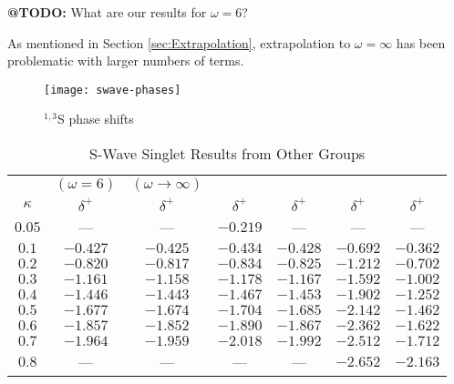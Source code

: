 \documentclass[Dissertation.tex]{subfiles}
\begin{document}
\textbf{@TODO:} What are our results for $\omega = 6$?

As mentioned in Section \ref{sec:Extrapolation}, extrapolation to $\omega = \infty$ has been problematic with larger numbers of terms.

\begin{figure}[H]
	\centering
	\texttt{[image: swave-phases]}
	\caption{$^{1,3}$S phase shifts}
	\label{fig:SWavePhase}
\end{figure}


\begin{table}[H]
\centering
\begin{tabular}{c c c c c c c}
\toprule
 & $(\omega = 6)$ & $(\omega \rightarrow \infty)$ &  &  &  & \\
$\kappa$ & $\delta^+$ \cite{VanReeth2003} & $\delta^+$ \cite{VanReeth2003} & $\delta^+$ \cite{Blackwood2002} & $\delta^+$ \cite{Walters2004} & $\delta^+$ \cite{Ray1997} & $\delta^+$ \cite{Adhikari1999} \\
\midrule
$0.05$ & --- & --- & $-0.219$ & --- & --- & --- \\
$0.1$ & $-0.427$ & $-0.425$ & $-0.434$ & $-0.428$ & $-0.692$ & $-0.362$ \\
$0.2$ & $-0.820$ & $-0.817$ & $-0.834$ & $-0.825$ & $-1.212$ & $-0.702$ \\
$0.3$ & $-1.161$ & $-1.158$ & $-1.178$ & $-1.167$ & $-1.592$ & $-1.002$ \\
$0.4$ & $-1.446$ & $-1.443$ & $-1.467$ & $-1.453$ & $-1.902$ & $-1.252$ \\
$0.5$ & $-1.677$ & $-1.674$ & $-1.704$ & $-1.685$ & $-2.142$ & $-1.462$ \\
$0.6$ & $-1.857$ & $-1.852$ & $-1.890$ & $-1.867$ & $-2.362$ & $-1.622$ \\
$0.7$ & $-1.964$ & $-1.959$ & $-2.018$ & $-1.992$ & $-2.512$ & $-1.712$ \\
$0.8$ &    --- &    --- &    --- &    --- & $-2.652$ & $-2.163$ \\
\bottomrule
\end{tabular}
\caption{S-Wave Singlet Results from Other Groups}
\label{tab:SWaveSingletOther}
\end{table}

\end{document}

